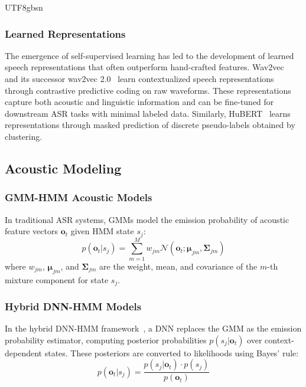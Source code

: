 \documentclass[12pt,a4paper]{article}
\begin{document}
\begin{CJK}{UTF8}{gbsn}
\subsubsection{Learned Representations}

The emergence of self-supervised learning has led to the development of learned speech representations that often outperform hand-crafted features. Wav2vec~\cite{schneider2019wav2vec} and its successor wav2vec 2.0~\cite{baevski2020wav2vec} learn contextualized speech representations through contrastive predictive coding on raw waveforms. These representations capture both acoustic and linguistic information and can be fine-tuned for downstream ASR tasks with minimal labeled data. Similarly, HuBERT~\cite{hsu2021hubert} learns representations through masked prediction of discrete pseudo-labels obtained by clustering.

\subsection{Acoustic Modeling}
\label{subsec:acoustic}

\subsubsection{GMM-HMM Acoustic Models}

In traditional ASR systems, GMMs model the emission probability of acoustic feature vectors $\mathbf{o}_t$ given HMM state $s_j$:
\begin{equation}
    p(\mathbf{o}_t | s_j) = \sum_{m=1}^{M} w_{jm} \mathcal{N}(\mathbf{o}_t; \bm{\mu}_{jm}, \bm{\Sigma}_{jm})
\end{equation}
where $w_{jm}$, $\bm{\mu}_{jm}$, and $\bm{\Sigma}_{jm}$ are the weight, mean, and covariance of the $m$-th mixture component for state $s_j$.

\subsubsection{Hybrid DNN-HMM Models}

In the hybrid DNN-HMM framework~\cite{bourlard1989links,bourlard2012connectionist}, a DNN replaces the GMM as the emission probability estimator, computing posterior probabilities $p(s_j | \mathbf{o}_t)$ over context-dependent states. These posteriors are converted to likelihoods using Bayes' rule:
\begin{equation}
    p(\mathbf{o}_t | s_j) = \frac{p(s_j | \mathbf{o}_t) \cdot p(s_j)}{p(\mathbf{o}_t)}
\end{equation}


\end{CJK}
\end{document}
